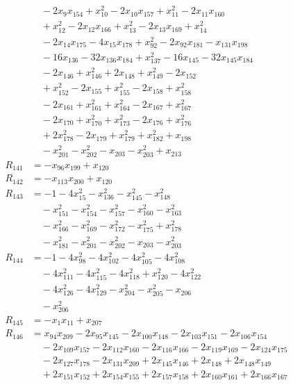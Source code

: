 \begin{align*}
&\quad -2x_{9}x_{154} +x_{10}^{2} -2x_{10}x_{157} +x_{11}^{2} -2x_{11}x_{160}\\
&\quad +x_{12}^{2} -2x_{12}x_{166} +x_{13}^{2} -2x_{13}x_{169} +x_{14}^{2}\\
&\quad -2x_{14}x_{175} -4x_{15}x_{178} +x_{92}^{2} -2x_{92}x_{181} -x_{131}x_{198}\\
&\quad -16x_{136} -32x_{136}x_{184} +x_{137}^{2} -16x_{145} -32x_{145}x_{184}\\
&\quad -2x_{146} +x_{146}^{2} +2x_{148} +x_{149}^{2} -2x_{152}\\
&\quad +x_{152}^{2} -2x_{155} +x_{155}^{2} -2x_{158} +x_{158}^{2}\\
&\quad -2x_{161} +x_{161}^{2} +x_{164}^{2} -2x_{167} +x_{167}^{2}\\
&\quad -2x_{170} +x_{170}^{2} +x_{173}^{2} -2x_{176} +x_{176}^{2}\\
&\quad +2x_{178}^{2} -2x_{179} +x_{179}^{2} +x_{182}^{2} +x_{198}\\
&\quad -x_{201}^{2} -x_{202}^{2} -x_{203} -x_{203}^{2} +x_{213}\\
R_{141} &= -x_{96}x_{199} +x_{120}\\
R_{142} &= -x_{113}x_{200} +x_{120}\\
R_{143} &= -1 -4x_{15}^{2} -x_{136}^{2} -x_{145}^{2} -x_{148}^{2}\\
&\quad -x_{151}^{2} -x_{154}^{2} -x_{157}^{2} -x_{160}^{2} -x_{163}^{2}\\
&\quad -x_{166}^{2} -x_{169}^{2} -x_{172}^{2} -x_{175}^{2} +x_{178}^{2}\\
&\quad -x_{181}^{2} -x_{201}^{2} -x_{202}^{2} -x_{203} -x_{203}^{2}\\
R_{144} &= -1 -4x_{98}^{2} -4x_{102}^{2} -4x_{105}^{2} -4x_{108}^{2}\\
&\quad -4x_{111}^{2} -4x_{115}^{2} -4x_{118}^{2} +x_{120}^{2} -4x_{122}^{2}\\
&\quad -4x_{126}^{2} -4x_{129}^{2} -x_{204}^{2} -x_{205}^{2} -x_{206}\\
&\quad -x_{206}^{2}\\
R_{145} &= -x_{1}x_{11} +x_{207}\\
R_{146} &= x_{94}x_{209} -2x_{95}x_{145} -2x_{100}x_{148} -2x_{103}x_{151} -2x_{106}x_{154}\\
&\quad -2x_{109}x_{157} -2x_{112}x_{160} -2x_{116}x_{166} -2x_{119}x_{169} -2x_{124}x_{175}\\
&\quad -2x_{127}x_{178} -2x_{131}x_{209} +2x_{145}x_{146} +2x_{148} +2x_{148}x_{149}\\
&\quad +2x_{151}x_{152} +2x_{154}x_{155} +2x_{157}x_{158} +2x_{160}x_{161} +2x_{166}x_{167}\\

\end{align*}
